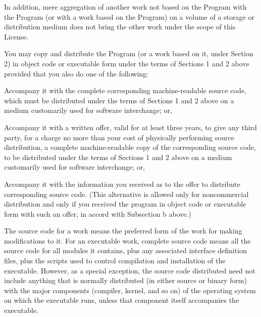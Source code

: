 \begin{lrbox}{\gpl}
\begin{minipage}{3\textwidth}
In addition, mere aggregation of another work not based on the Program
with the Program (or with a work based on the Program) on a volume of
a storage or distribution medium does not bring the other work under
the scope of this License.

\item
You may copy and distribute the Program (or a work based on it,
under Section 2) in object code or executable form under the terms of
Sections 1 and 2 above provided that you also do one of the following:

\beginenumeration

\item

Accompany it with the complete corresponding machine-readable
source code, which must be distributed under the terms of Sections
1 and 2 above on a medium customarily used for software interchange; or,

\item

Accompany it with a written offer, valid for at least three
years, to give any third party, for a charge no more than your
cost of physically performing source distribution, a complete
machine-readable copy of the corresponding source code, to be
distributed under the terms of Sections 1 and 2 above on a medium
customarily used for software interchange; or,

\item

Accompany it with the information you received as to the offer
to distribute corresponding source code.  (This alternative is
allowed only for noncommercial distribution and only if you
received the program in object code or executable form with such
an offer, in accord with Subsection b above.)

\endenumeration


The source code for a work means the preferred form of the work for
making modifications to it.  For an executable work, complete source
code means all the source code for all modules it contains, plus any
associated interface definition files, plus the scripts used to
control compilation and installation of the executable.  However, as a
special exception, the source code distributed need not include
anything that is normally distributed (in either source or binary
form) with the major components (compiler, kernel, and so on) of the
operating system on which the executable runs, unless that component
itself accompanies the executable.


\end{minipage}
\end{lrbox}
